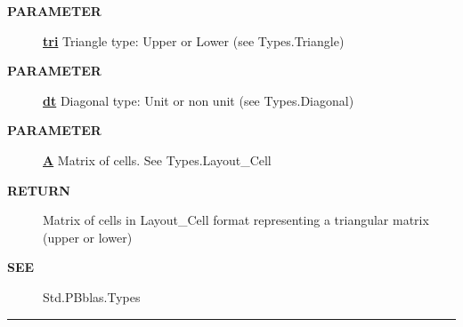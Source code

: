 \par
\begin{description}
\item [\colorbox{tagtype}{\color{white} \textbf{\textsf{PARAMETER}}}] \textbf{\underline{tri}} Triangle type: Upper or Lower (see Types.Triangle)
\item [\colorbox{tagtype}{\color{white} \textbf{\textsf{PARAMETER}}}] \textbf{\underline{dt}} Diagonal type: Unit or non unit (see Types.Diagonal)
\item [\colorbox{tagtype}{\color{white} \textbf{\textsf{PARAMETER}}}] \textbf{\underline{A}} Matrix of cells. See Types.Layout\_Cell
\item [\colorbox{tagtype}{\color{white} \textbf{\textsf{RETURN}}}] \textbf{\underline{}} Matrix of cells in Layout\_Cell format representing a triangular matrix (upper or lower)
\item [\colorbox{tagtype}{\color{white} \textbf{\textsf{SEE}}}] \textbf{\underline{}} Std.PBblas.Types
\end{description}

\rule{\linewidth}{0.5pt}
